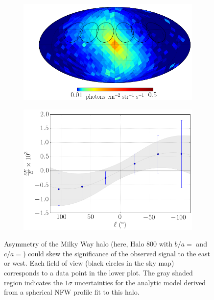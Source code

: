\documentclass[aps,prl,10pt,twocolumn,superscriptaddress,showpacs]{revtex4-1}
\begin{document}
\begin{figure}[h!]
\centering
\begin{subfigure}[b]{1.0\columnwidth}
	\includegraphics[width=\textwidth]{flux_map_800.png}
\end{subfigure}
\par\medskip
\begin{subfigure}[b]{1.0\columnwidth}
	\includegraphics[width=\textwidth]{de_vs_l_800.png}
\end{subfigure}
\caption{Asymmetry of the Milky Way halo (here, Halo 800 with $b/a=$ and $c/a=$) could skew the significance of the
	observed signal to the east or west. Each field of view (black circles in the sky map) corresponds to a data point in
the lower plot. The gray shaded region indicates the $1\sigma$ uncertainties for the analytic model
derived from a spherical NFW profile fit to this halo.}
\label{fig:triax}
\end{figure}
\end{document}
